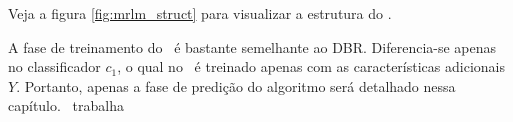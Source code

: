 %  
 
%   
  
  Veja a figura \ref{fig:mrlm_struct} para visualizar a estrutura do \MRLMa. 
  
  A fase de treinamento do \MRLMa~é bastante semelhante ao DBR.
  Diferencia-se apenas no classificador $c_1$, o qual no \MRLMa~é treinado apenas com as características adicionais $Y$.
  Portanto, apenas a fase de predição do algoritmo será detalhado nessa capítulo.
  \MRLMa~trabalha
  
